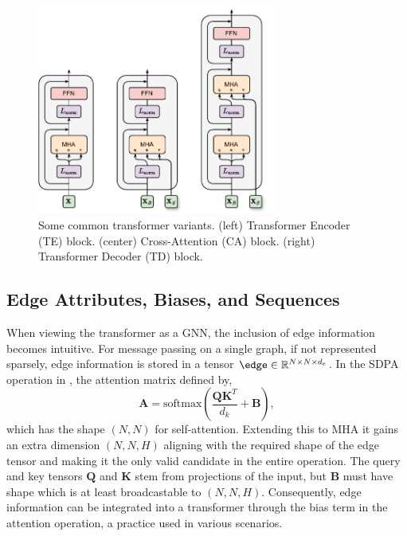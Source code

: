 \begin{figure}
    \centering
    \includegraphics[width=0.7\textwidth]{Figures/graph_networks/transformer_variants.pdf}
    \caption{Some common transformer variants. (left) Transformer Encoder (TE) block. (center) Cross-Attention (CA) block. (right) Transformer Decoder (TD) block.}
    \label{fig:transformer_blocks}
\end{figure}

\subsection{Edge Attributes, Biases, and Sequences}
\label{sec:edge_biases_sequences}

When viewing the transformer as a GNN, the inclusion of edge information becomes intuitive.
For message passing on a single graph, if not represented sparsely, edge information is stored in a tensor $\edge \in \mathbb{R}^{N \times N \times d_e}$.
In the SDPA operation in , the attention matrix defined by,
\begin{equation}
    \mathbf{A} = \text{softmax}\left( \frac{\mathbf{Q} \mathbf{K}^T}{d_k} + \mathbf{B} \right),
\end{equation}
which has the shape $(N, N)$ for self-attention.
Extending this to MHA it gains an extra dimension $(N, N, H)$ aligning with the required shape of the edge tensor and making it the only valid candidate in the entire operation.
The query and key tensors $\mathbf{Q}$ and $\mathbf{K}$ stem from projections of the input, but $\mathbf{B}$ must have shape which is at least broadcastable to $(N, N, H)$.
Consequently, edge information can be integrated into a transformer through the bias term in the attention operation, a practice used in various scenarios.

